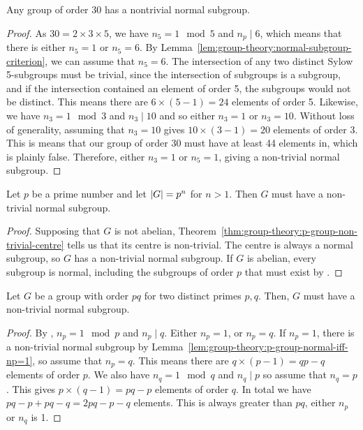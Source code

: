\begin{proposition}
  Any group of order 30 has a nontrivial normal subgroup.
\end{proposition}

\begin{proof}
  As \(30 = 2 \times 3 \times 5\), we have \(n_{5} = 1 \mod 5\) and \(n_{p} \mid 6\), which means that there is either \(n_{5} = 1\) or \(n_{5} = 6\). By Lemma~\ref{lem:group-theory:normal-subgroup-criterion}, we can assume that \(n_{5} = 6\). The intersection of any two distinct Sylow 5-subgroups must be trivial, since the intersection of subgroups is a subgroup, and if the intersection contained an element of order 5, the subgroups would not be distinct. This means there are \(6 \times (5-1) = 24\) elements of order 5. Likewise, we have \(n_{3} = 1 \mod 3\) and \(n_{3} \mid 10\) and so either \(n_{3} = 1\) or  \(n_{3} = 10\). Without loss of generality, assuming that \(n_{3} = 10\) gives \(10 \times (3 - 1) = 20\) elements of order 3. This is means that our group of order 30 must have at least 44 elements in, which is plainly false. Therefore, either \(n_{3} = 1\) or \(n_{5} = 1\), giving a non-trivial normal subgroup.
\end{proof}

\begin{lemma}
  Let \(p\) be a prime number and let \(\abs{G} = p^{n}\) for \(n > 1\). Then \(G\) must have a non-trivial normal subgroup.
\end{lemma}

\begin{proof}
  Supposing that \(G\) is not abelian, Theorem~\ref{thm:group-theory:p-group-non-trivial-centre} tells us that its centre is non-trivial. The centre is always a normal subgroup, so \(G\) has a non-trivial normal subgroup. If \(G\) is abelian, every subgroup is normal, including the subgroups of order \(p\) that must exist by .
\end{proof}

\begin{lemma}
  Let \(G\) be a group with order \(pq\) for two distinct primes \(p, q\). Then, \(G\) must have a non-trivial normal subgroup.
\end{lemma}

\begin{proof}
  By , \(n_{p} = 1 \mod p\) and \(n_{p} \mid q\). Either \(n_{p} = 1\), or \(n_{p} = q\). If \(n_{p} = 1\), there is a non-trivial normal subgroup by Lemma~\ref{lem:group-theory:p-group-normal-iff-np=1}, so assume that \(n_{p} = q\). This means there are \(q \times (p - 1) = qp - q\) elements of order \(p\). We also have \(n_{q} = 1 \mod q\) and \(n_{q} \mid p\) so assume that \(n_{q} = p\). This gives \(p \times (q -1) = pq - p\) elements of order \(q\). In total we have \(pq-p + pq-q = 2pq - p - q\) elements. This is always greater than \(pq\), either \(n_{p}\) or \(n_{q}\) is 1.
\end{proof}

